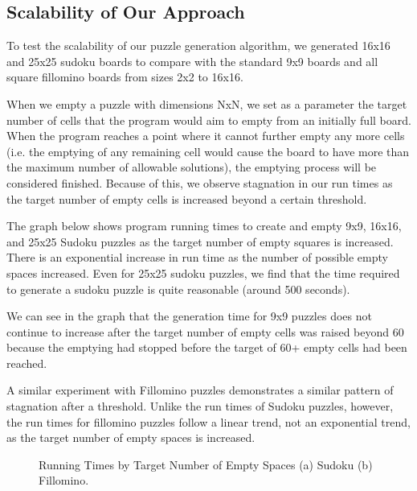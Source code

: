 \subsection{Scalability of Our Approach}

To test the scalability of our puzzle generation algorithm, we
generated 16x16 and 25x25 sudoku boards to compare with the standard
9x9 boards and all square fillomino boards from sizes 2x2 to 16x16.

When we empty a puzzle with dimensions NxN, we set as a parameter the
target number of cells that the program would aim to empty from an
initially full board. When the program reaches a point where it cannot
further empty any more cells (i.e. the emptying of any remaining cell
would cause the board to have more than the maximum number of
allowable solutions), the emptying process will be considered
finished. Because of this, we observe stagnation in our run times as
the target number of empty cells is increased beyond a certain
threshold.

The graph below shows program running times to create and empty 9x9, 16x16, and 25x25 Sudoku puzzles as the target number of empty squares is increased. There is an exponential increase in run time as the number of possible empty spaces increased. Even for 25x25 sudoku puzzles, we find that the time required to generate a sudoku puzzle is quite reasonable (around 500 seconds).

We can see in the graph that the generation time for 9x9 puzzles does not continue to increase after the target number of empty cells was raised beyond 60 because the emptying had stopped before the target of 60+ empty cells had been reached. 

A similar experiment with Fillomino puzzles demonstrates a similar pattern of stagnation after a threshold. Unlike the run times of Sudoku puzzles, however, the run times for fillomino puzzles follow a linear trend, not an exponential trend, as the target number of empty spaces is increased.

\begin{figure}
     \centering
     \caption{Running Times by Target Number of Empty Spaces (a) Sudoku (b) Fillomino.}
\end{figure}





